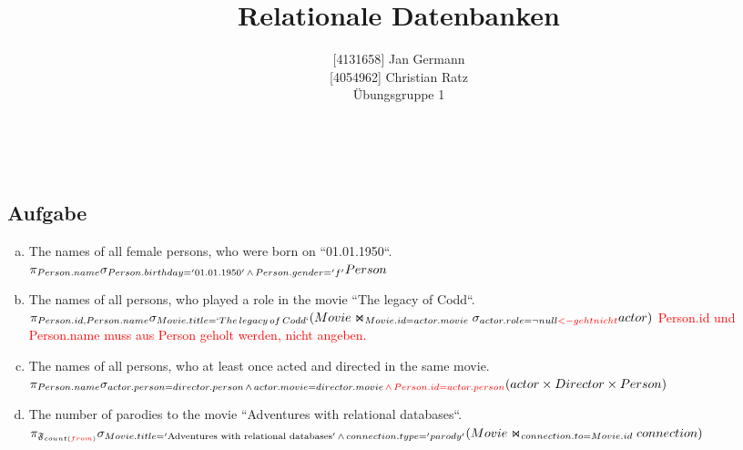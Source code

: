 \documentclass[11pt,a4paper,DIV=9]{scrartcl}
\author{{[}4131658{]} Jan Germann \\{[}4054962{]} Christian Ratz\\Übungsgruppe 1}
\title{Relationale Datenbanken}
\newcounter{temp}
\newcommand{\aufgabe}[1]{
  \setcounter{temp}{\value{subsection}}
  \setcounter{subsection}{#1}
  \addtocounter{subsection}{-1}
  \subsection{Aufgabe}
  \setcounter{subsection}{\value{temp}}
}
\renewcommand{\author}[1]{\renewcommand{\author}{#1}}
\renewcommand{\title}[1]{\renewcommand{\title}{#1}}
\newcommand{\makehomeworktitle}{
  \begin{minipage}[t]{6.5cm}
    \sf{\author}
  \end{minipage}
  \begin{minipage}[t]{6.5cm}
    \begin{flushright}
      \sf{\title\\\today}
    \end{flushright}
  \end{minipage}
  \\[0.2cm]
  \begin{center}
    \sf{
      \color{blue}{
        \LARGE{Aufgabenblatt \blattnr}
      }
    }
  \end{center}
  \vspace{0.1cm}
}
\begin{document}
\makehomeworktitle
\aufgabe{1}
  \begin{enumerate}[a)]
    \item The names of all female persons, who were born on ``01.01.1950``.\hfill\\
      $
      \pi_{Person.name}\\
      \sigma_{Person.birthday = '01.01.1950'\,\wedge\,Person.gender = 'f'}\\
      Person
      $
    \item The names of all persons, who played a role in the movie ``The legacy of Codd``. \hfill\\
      $
      \pi _{Person.id, Person.name}\\
      \sigma _{Movie.title=`{The\, legacy\, of\, Codd`}}\\
      (Movie\Join_{Movie.id = actor.movie} \sigma _{actor.role = \neg null\textcolor{red}{ <-geht nicht }} actor)
      $
      \textcolor{red}{Person.id und Person.name muss aus Person geholt werden, nicht angeben.}
    \item The names of all persons, who at least once acted and directed in the same movie.\hfill\\
      $
      \pi _{Person.name}\\
      \sigma _{actor.person = director.person \,\wedge\, actor.movie = director.movie \, \textcolor{red}{\wedge\, Person.id=actor.person}}\\
      (actor \times Director \times Person)
      $
    \item The number of parodies to the movie ``Adventures with relational databases``.
      $
      \pi_{\mathfrak{F}_{count(\textcolor{red}{from})}} \\
      \sigma_{Movie.title = '\textrm{Adventures with relational databases}' \,\wedge\, connection.type = 'parody'}\\
      (Movie\Join_{connection.to = Movie.id}connection)
      $


\end{enumerate}
\end{document}
